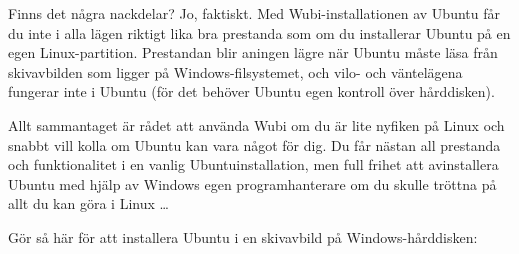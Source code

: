 \documentclass[a4paper,final]{memoir} %
\begin{document}

Finns det några nackdelar? Jo, faktiskt. Med Wubi-installationen av Ubuntu får du inte i alla lägen riktigt lika bra prestanda som om du installerar Ubuntu på en egen Linux-partition. Prestandan blir aningen lägre när Ubuntu måste läsa från skivavbilden som ligger på Windows-filsystemet, och vilo- och väntelägena fungerar inte i Ubuntu (för det behöver Ubuntu egen kontroll över hårddisken).

Allt sammantaget är rådet att använda Wubi om du är lite nyfiken på Linux och snabbt vill kolla om Ubuntu kan vara något för dig. Du får nästan all prestanda och funktionalitet i en vanlig Ubuntuinstallation, men full frihet att avinstallera Ubuntu med hjälp av Windows egen programhanterare om du skulle tröttna på allt du kan göra i Linux \ldots{}

Gör så här för att installera Ubuntu i en skivavbild på Windows-hårddisken:
\end{document}
